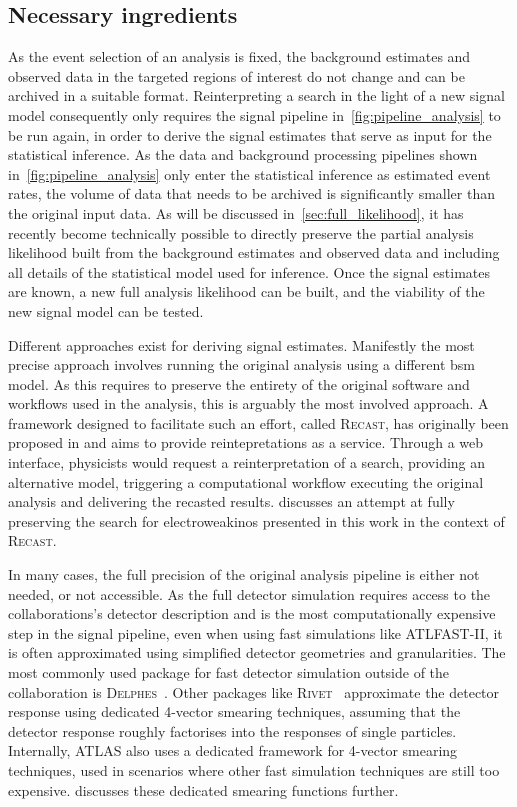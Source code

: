 \subsection{Necessary ingredients}

As the event selection of an analysis is fixed, the background estimates and observed data in the targeted regions of interest do not change and can be archived in a suitable format. Reinterpreting a search in the light of a new signal model consequently only requires the signal pipeline in~\cref{fig:pipeline_analysis} to be run again, in order to derive the signal estimates that serve as input for the statistical inference. As the data and background processing pipelines shown in~\cref{fig:pipeline_analysis} only enter the statistical inference as estimated event rates, the volume of data that needs to be archived is significantly smaller than the original input data. As will be discussed in~\cref{sec:full_likelihood}, it has recently become technically possible to directly preserve the partial analysis likelihood built from the background estimates and observed data and including all details of the statistical model used for inference. Once the signal estimates are known, a new full analysis likelihood can be built, and the viability of the new signal model can be tested. 

Different approaches exist for deriving signal estimates. Manifestly the most precise approach involves running the original analysis using a different \gls{bsm} model. As this requires to preserve the entirety of the original software and workflows used in the analysis, this is arguably the most involved approach. A framework designed to facilitate such an effort, called \textsc{Recast}, has originally been proposed in \cite{RECAST_cranmer} and aims to provide reintepretations as a service. Through a web interface, physicists would request a reinterpretation of a search, providing an alternative model, triggering a computational workflow executing the original analysis and delivering the recasted results.  discusses an attempt at fully preserving the search for electroweakinos presented in this work in the context of \textsc{Recast}. 

In many cases, the full precision of the original analysis pipeline is either not needed, or not accessible. As the full detector simulation requires access to the collaborations's detector description and is the most computationally expensive step in the signal pipeline, even when using fast simulations like \textsc{ATLFAST-II}, it is often approximated using simplified detector geometries and granularities. The most commonly used package for fast detector simulation outside of the collaboration is \textsc{Delphes}~\cite{Delphes:2009tx}. Other packages like \eg \textsc{Rivet}~\cite{Rivet1:2010ar,Rivet2:2019stt} approximate the detector response using dedicated 4-vector smearing techniques, assuming that the detector response roughly factorises into the responses of single particles. Internally, ATLAS also uses a dedicated framework for 4-vector smearing techniques, used in scenarios where other fast simulation techniques are still too expensive.  discusses these dedicated smearing functions further.

